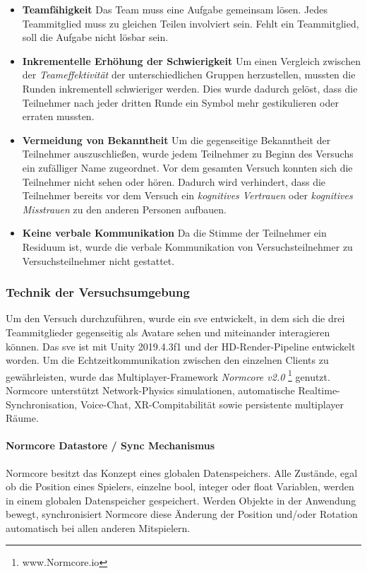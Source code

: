 \documentclass[a4paper,11pt]{article}%
\renewcommand{\\}{\vspace*{0.5\baselineskip} \newline}
\begin{document}
\begin{itemize}
\item \textbf{Teamfähigkeit} Das Team muss eine Aufgabe gemeinsam lösen. Jedes Teammitglied muss zu gleichen Teilen involviert sein. Fehlt ein Teammitglied, soll die Aufgabe nicht lösbar sein.
\item \textbf{Inkrementelle Erhöhung der Schwierigkeit} Um einen Vergleich zwischen der \textit{Teameffektivität} der unterschiedlichen Gruppen herzustellen, mussten die Runden inkrementell schwieriger werden. Dies wurde dadurch gelöst, dass die Teilnehmer nach jeder dritten Runde ein Symbol mehr gestikulieren oder erraten mussten.
\item \textbf{Vermeidung von Bekanntheit} Um die gegenseitige Bekanntheit der Teilnehmer auszuschließen, wurde jedem Teilnehmer zu Beginn des Versuchs ein zufälliger Name zugeordnet. Vor dem gesamten Versuch konnten sich die Teilnehmer nicht sehen oder hören.
Dadurch wird verhindert, dass die Teilnehmer bereits vor dem Versuch ein \textit{kognitives Vertrauen} oder \textit{kognitives Misstrauen} zu den anderen Personen aufbauen.
\item \textbf{Keine verbale Kommunikation} Da die Stimme der Teilnehmer ein Residuum ist, wurde die verbale Kommunikation von Versuchsteilnehmer zu Versuchsteilnehmer nicht gestattet. 
\end{itemize}

\subsubsection{Technik der Versuchsumgebung}
Um den Versuch durchzuführen, wurde ein \ac{sve} entwickelt, in dem sich die drei Teammitglieder gegenseitig als Avatare sehen und miteinander interagieren können. Das \ac{sve} ist mit Unity 2019.4.3f1 und der HD-Render-Pipeline entwickelt worden. Um die Echtzeitkommunikation zwischen den einzelnen Clients zu gewährleisten, wurde das Multiplayer-Framework \textit{Normcore v2.0} \footnote{www.Normcore.io} genutzt.
Normcore unterstützt Network-Physics simulationen, automatische Realtime- Synchronisation, Voice-Chat, XR-Compitabilität sowie persistente multiplayer Räume.	

\paragraph{Normcore Datastore / Sync Mechanismus}
Normcore besitzt das Konzept eines globalen Datenspeichers.  Alle Zustände, egal ob die Position eines Spielers, einzelne bool, integer oder float Variablen, werden in einem globalen Datenspeicher gespeichert. Werden Objekte in der Anwendung bewegt, synchronisiert Normcore diese Änderung der Position und/oder Rotation automatisch bei allen anderen Mitspielern.
\end{document}
